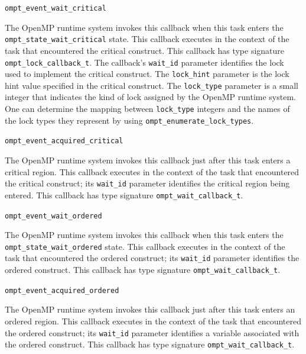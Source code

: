 \documentclass{article}
\newcommand{\descheader}[1]{{\needspace{3\baselineskip}\vspace{1em}\noindent \fbox{#1}}}
\begin{document}
\begin{description}
 
\item \verb|ompt_event_wait_critical|

\sloppy
   The OpenMP runtime system invokes this callback when this task
   enters the \verb|ompt_state_wait_critical| state.  This callback
   executes in the context of the task that encountered the critical construct.
   This callback has type signature \verb|ompt_lock_callback_t|. 
    The callback's \verb|wait_id| parameter identifies the lock used to implement the critical construct.
   The \verb|lock_hint| parameter is the lock hint value specified in the critical construct.
   The \verb|lock_type| parameter is a small integer that indicates the kind of lock assigned by the OpenMP runtime system. 
   One can determine the mapping between \verb|lock_type| integers and the names of the lock types they represent by using 
   \verb|ompt_enumerate_lock_types|. 

\item \verb|ompt_event_acquired_critical|

   The OpenMP runtime system invokes this callback just after this
   task enters a critical region.  This callback executes in the
   context of the task that encountered the critical construct; its \verb|wait_id| parameter identifies the
   critical region being entered.
   This callback  has type signature \verb|ompt_wait_callback_t|. 

\end{description}

\descheader{Ordered Sections}

\begin{description}

\item \verb|ompt_event_wait_ordered|

\sloppy
   The OpenMP runtime system invokes this callback when this task
   enters the \verb|ompt_state_wait_ordered| state.  This callback executes
   in the context of the task that encountered the ordered construct; its \verb|wait_id| parameter identifies
   the ordered construct.
   This callback has type signature \verb|ompt_wait_callback_t|. 

\item \verb|ompt_event_acquired_ordered|

   The OpenMP runtime system invokes this callback just after this
   task enters an ordered region.  This callback executes in the
   context of the task that encountered the ordered construct; its \verb|wait_id| parameter identifies a
   variable associated with the ordered construct.
   This callback  has type signature \verb|ompt_wait_callback_t|. 

\end{description}
\end{document}
